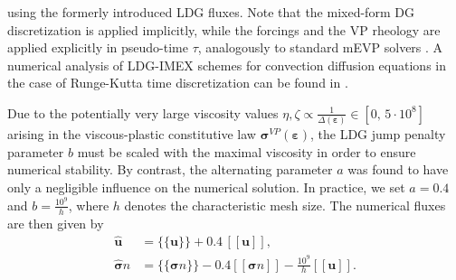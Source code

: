 \documentclass[11pt]{article}
\newcommand{\bu}{\mathbf{u}}
\newcommand{\sig}{\boldsymbol{\sigma}}
\newcommand{\beps}{\boldsymbol{\varepsilon}}
\newcommand{\ljp}{ [\![ }
\newcommand{\rjp}{ ]\!] }
\begin{document}
\endgroup%
using the formerly introduced LDG fluxes.
Note that the mixed-form DG discretization is applied implicitly, while the forcings and the VP rheology are applied explicitly in pseudo-time $\tau$, analogously to standard mEVP solvers \cite{richter2023dynamical}.
A numerical analysis of LDG-IMEX schemes for convection diffusion equations in the case of Runge-Kutta time discretization can be found in \cite{wang2016local}.


Due to the potentially very large viscosity values $\eta, \zeta \propto \frac{1}{\Delta (\beps)} \in [0,\, 5\cdot  10^{8}]$ arising in the viscous-plastic constitutive law $\sig^{VP}(\beps)$, the LDG jump penalty parameter $b$ must be scaled with the maximal viscosity in order to ensure numerical stability. By contrast, the alternating parameter $a$ was found to have only a negligible influence on the numerical solution. In practice, we set $a = 0.4$ and $b = \frac{10^9}{h}$, where $h$ denotes the characteristic mesh size. The numerical fluxes are then given by
\begin{subequations}
    \begin{align}
\widehat{\mathbf{u}} &= \{\!\{\bu \}\!\} + 0.4 \, \ljp \bu\rjp, \\
\widehat{\sig} n
&=
\{\!\{\sig n\}\!\} - 0.4 \ljp \sig n \rjp
- \frac{10^9}{h} [\![\bu]\!].
\end{align}
\label{seq:numerical fluxes}
\end{subequations}
\end{document}
